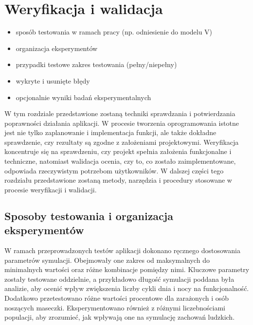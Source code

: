 \chapter{Weryfikacja i walidacja}
\label{ch:06}
\begin{itemize}
\item sposób testowania w ramach pracy (np. odniesienie do modelu V)
\item organizacja eksperymentów
\item przypadki testowe zakres testowania (pełny/niepełny)
\item wykryte i usunięte błędy
\item opcjonalnie wyniki badań eksperymentalnych
\end{itemize}

W tym rozdziale przedstawione zostaną techniki sprawdzania i potwierdzania poprawności działania aplikacji. W procesie tworzenia oprogramowania istotne jest nie tylko zaplanowanie i implementacja funkcji, ale także dokładne sprawdzenie, czy rezultaty są zgodne z założeniami projektowymi. Weryfikacja koncentruje się na sprawdzeniu, czy projekt spełnia założenia funkcjonalne i techniczne, natomiast walidacja ocenia, czy to, co zostało zaimplementowane, odpowiada rzeczywistym potrzebom użytkowników. W dalszej części tego rozdziału przedstawione zostaną metody, narzędzia i procedury stosowane w procesie weryfikacji i walidacji.\\

\section{Sposoby testowania i organizacja eksperymentów}

W ramach przeprowadzonych testów aplikacji dokonano ręcznego dostosowania parametrów symulacji. Obejmowały one zakres od maksymalnych do minimalnych wartości oraz różne kombinacje pomiędzy nimi. Kluczowe parametry zostały testowane oddzielnie, a przykładowo długość symulacji poddana była analizie, aby ocenić wpływ zwiększenia liczby cykli dnia i nocy na funkcjonalność. Dodatkowo przetestowano różne wartości procentowe dla zarażonych i osób noszących maseczki. Eksperymentowano również z różnymi liczebnościami populacji, aby zrozumieć, jak wpływają one na symulację zachowań ludzkich.

%

